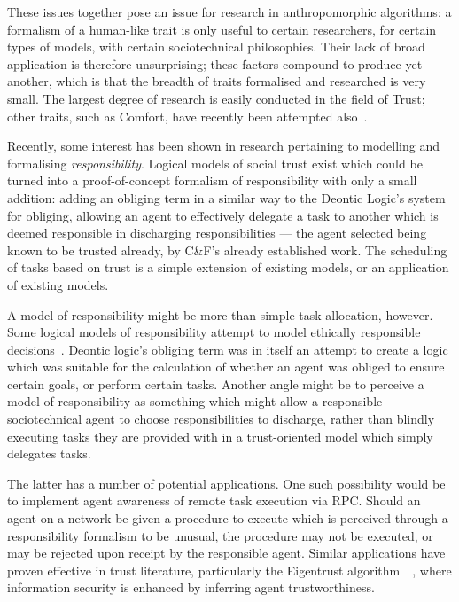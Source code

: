 These issues together pose an issue for research in anthropomorphic algorithms: a formalism of a human-like trait is only useful to certain researchers, for certain types of models, with certain sociotechnical philosophies. Their lack of broad application is therefore unsurprising; these factors compound to produce yet another, which is that the breadth of traits formalised and researched is very small. The largest degree of research is easily conducted in the field of Trust; other traits, such as Comfort, have recently been attempted also~\cite{marsh2011defining}.\par

Recently, some interest has been shown in research pertaining to modelling and formalising \emph{responsibility}. Logical models of social trust exist which could be turned into a proof-of-concept formalism of responsibility with only a small addition: adding an obliging term in a similar way to the Deontic Logic's system for obliging\cite{deontic-logic}, allowing an agent to effectively delegate a task to another which is deemed responsible in discharging responsibilities --- the agent selected being known to be trusted already, by C\&F's already established work. The scheduling of tasks based on trust is a simple extension of existing models, or an application of existing models.\par

A model of responsibility might be more than simple task allocation, however. Some logical models of responsibility attempt to model ethically responsible decisions~\cite{berreby2015modelling}. Deontic logic's obliging term was in itself an attempt to create a logic which was suitable for the calculation of whether an agent was obliged to ensure certain goals, or perform certain tasks. Another angle might be to perceive a model of responsibility as something which might allow a responsible sociotechnical agent to choose responsibilities to discharge, rather than blindly executing tasks they are provided with in a trust-oriented model which simply delegates tasks.\par

The latter has a number of potential applications. One such possibility would be to implement agent awareness of remote task execution via RPC. Should an agent on a network be given a procedure to execute which is perceived through a responsibility formalism to be unusual, the procedure may not be executed, or may be rejected upon receipt by the responsible agent. Similar applications have proven effective in trust literature, particularly the Eigentrust algorithm~\cite{eigentrust}~, where information security is enhanced by inferring agent trustworthiness.\par

